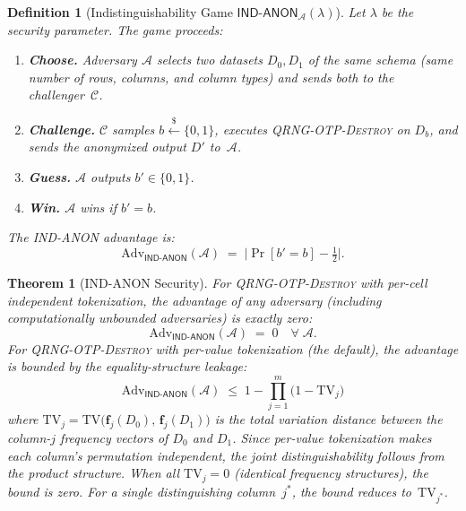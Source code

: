 \documentclass[journal]{IEEEtran}
\newtheorem{theorem}{Theorem}
\newtheorem{definition}{Definition}
\begin{document}
\begin{definition}[Indistinguishability Game $\mathsf{IND\text{-}ANON}_{\mathcal{A}}(\lambda)$]
\label{def:ind-anon}
Let $\lambda$ be the security parameter. The game proceeds:
\begin{enumerate}
\item \textbf{Choose.} Adversary $\mathcal{A}$ selects two datasets $D_0, D_1$ of the same schema (same number of rows, columns, and column types) and sends both to the challenger~$\mathcal{C}$.
\item \textbf{Challenge.} $\mathcal{C}$ samples $b \xleftarrow{\$} \{0,1\}$, executes \textsc{QRNG-OTP-Destroy} on $D_b$, and sends the anonymized output $D'$ to~$\mathcal{A}$.
\item \textbf{Guess.} $\mathcal{A}$ outputs $b' \in \{0,1\}$.
\item \textbf{Win.} $\mathcal{A}$ wins if $b' = b$.
\end{enumerate}
The IND-ANON advantage is:
\begin{equation}
\mathrm{Adv}_{\mathsf{IND\text{-}ANON}}(\mathcal{A}) \;=\; \bigl|\Pr[b' {=} b] - \tfrac{1}{2}\bigr|.
\label{eq:ind-anon-adv}
\end{equation}
\end{definition}

\begin{theorem}[IND-ANON Security]
\label{thm:ind-anon}
For \textsc{QRNG-OTP-Destroy} with per-cell independent tokenization, the advantage of any adversary (including computationally unbounded adversaries) is exactly zero:
\begin{equation}
\mathrm{Adv}_{\mathsf{IND\text{-}ANON}}(\mathcal{A}) \;=\; 0 \quad \forall\;\mathcal{A}.
\end{equation}
For \textsc{QRNG-OTP-Destroy} with per-value tokenization (the default), the advantage is bounded by the equality-structure leakage:
\begin{equation}
\mathrm{Adv}_{\mathsf{IND\text{-}ANON}}(\mathcal{A}) \;\leq\; 1 - \prod_{j=1}^{m}\bigl(1 - \mathrm{TV}_j\bigr)
\label{eq:ind-anon-eq-bound}
\end{equation}
where $\mathrm{TV}_j = \mathrm{TV}\bigl(\mathbf{f}_j(D_0),\, \mathbf{f}_j(D_1)\bigr)$ is the total variation distance between the column-$j$ frequency vectors of $D_0$ and $D_1$. Since per-value tokenization makes each column's permutation independent, the joint distinguishability follows from the product structure. When all $\mathrm{TV}_j = 0$ (identical frequency structures), the bound is zero. For a single distinguishing column~$j^*$, the bound reduces to~$\mathrm{TV}_{j^*}$.
\end{theorem}
\end{document}
